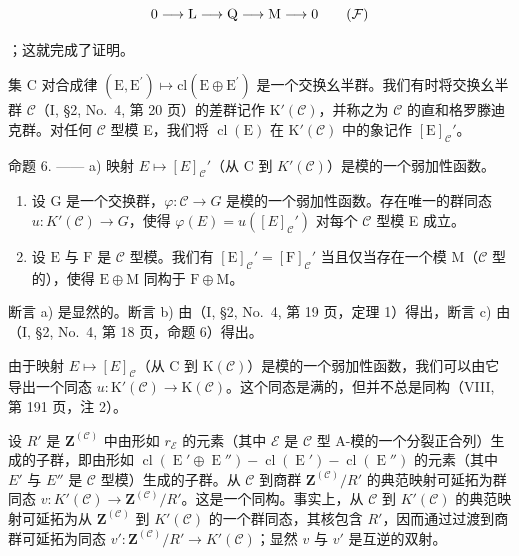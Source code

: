 \[
0 \longrightarrow \mathrm{L} \longrightarrow \mathrm{Q} \longrightarrow \mathrm{M} \longrightarrow 0\tag{\( \mathcal{F} \)}
\]

；这就完成了证明。

集 C 对合成律 \((\mathrm{E}, \mathrm{E}^{\prime}) \mapsto \mathrm{cl}(\mathrm{E} \oplus \mathrm{E}^{\prime})\) 是一个交换幺半群。我们有时将交换幺半群 \(\mathcal{C}\)（I, §2, No.~4, 第 20 页）的差群记作 \(\mathrm{K}'(\mathcal{C})\)，并称之为 \(\mathcal{C}\) 的直和格罗滕迪克群。对任何 \(\mathcal{C}\) 型模 E，我们将 \(\operatorname{cl}(\mathrm{E})\) 在 \(\mathrm{K}'(\mathcal{C})\) 中的象记作 \([\mathrm{E}]_{\mathcal{C}}'\)。

命题 6. —— a) 映射 \(E \mapsto [E]_{\mathcal{C}}'\)（从 C 到 \(K'(\mathcal{C})\)）是模的一个弱加性函数。

\begin{enumerate}
\def\labelenumi{\alph{enumi})}
\setcounter{enumi}{1}
\item
  设 G 是一个交换群，\(\varphi : \mathcal{C} \to G\) 是模的一个弱加性函数。存在唯一的群同态 \(u: K'(\mathcal{C}) \to G\)，使得 \(\varphi(E) = u([E]_{\mathcal{C}}')\) 对每个 \(\mathcal{C}\) 型模 E 成立。
\item
  设 \(\mathrm{E}\) 与 \(\mathrm{F}\) 是 \(\mathcal{C}\) 型模。我们有 \([\mathrm{E}]_{\mathcal{C}}' = [\mathrm{F}]_{\mathcal{C}}'\) 当且仅当存在一个模 \(\mathrm{M}\)（\(\mathcal{C}\) 型的），使得 \(\mathrm{E} \oplus \mathrm{M}\) 同构于 \(\mathrm{F} \oplus \mathrm{M}\)。
\end{enumerate}

断言 a) 是显然的。断言 b) 由（I, §2, No.~4, 第 19 页，定理 1）得出，断言 c) 由（I, §2, No.~4, 第 18 页，命题 6）得出。

由于映射 \(E \mapsto [E]_{\mathcal{C}}\)（从 C 到 \(\mathrm{K}(\mathcal{C})\)）是模的一个弱加性函数，我们可以由它导出一个同态 \(u : \mathrm{K}'(\mathcal{C}) \to \mathrm{K}(\mathcal{C})\)。这个同态是满的，但并不总是同构（VIII, 第 191 页，注 2）。

设 \(R'\) 是 \(\mathbf{Z}^{(\mathcal{C})}\) 中由形如 \(r_{\mathcal{E}}\) 的元素（其中 \(\mathcal{E}\) 是 \(\mathcal{C}\) 型 A-模的一个分裂正合列）生成的子群，即由形如 \(\operatorname{cl}(\operatorname{E}' \oplus \operatorname{E}'') - \operatorname{cl}(\operatorname{E}') - \operatorname{cl}(\operatorname{E}'')\) 的元素（其中 \(E'\) 与 \(E''\) 是 \(\mathcal{C}\) 型模）生成的子群。从 \(\mathcal{C}\) 到商群 \(\mathbf{Z}^{(\mathcal{C})}/R'\) 的典范映射可延拓为群同态 \(v: K'(\mathcal{C}) \to \mathbf{Z}^{(\mathcal{C})}/R'\)。这是一个同构。事实上，从 \(\mathcal{C}\) 到 \(K'(\mathcal{C})\) 的典范映射可延拓为从 \(\mathbf{Z}^{(\mathcal{C})}\) 到 \(K'(\mathcal{C})\) 的一个群同态，其核包含 \(R'\)，因而通过过渡到商群可延拓为同态 \(v': \mathbf{Z}^{(\mathcal{C})}/R' \to K'(\mathcal{C})\)；显然 \(v\) 与 \(v'\) 是互逆的双射。

